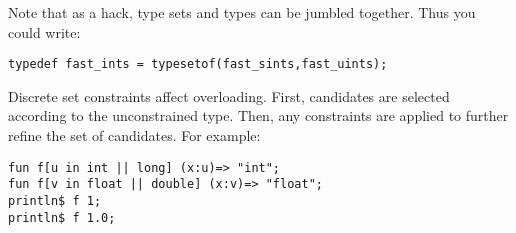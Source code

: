 \documentclass{report}
\begin{document}
Note that as a hack, type sets and types can be jumbled
together. Thus you could write:
\begin{verbatim}
typedef fast_ints = typesetof(fast_sints,fast_uints);
\end{verbatim}

Discrete set constraints affect overloading. First, candidates
are selected according to the unconstrained type. Then, any
constraints are applied to further refine the set of candidates.
For example:

\begin{verbatim}
fun f[u in int || long] (x:u)=> "int";
fun f[v in float || double] (x:v)=> "float";
println$ f 1;
println$ f 1.0;
\end{verbatim}
\end{document}
